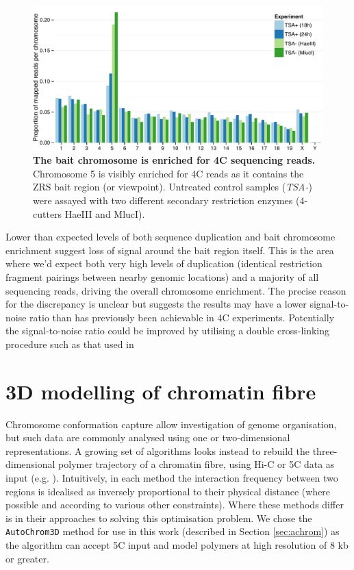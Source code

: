\documentclass[a4paper,11pt,oneside]{book}
\begin{document}
\begin{figure}
\begin{center} 
\includegraphics[width=5.4in]{figs/4c_chromosomes.pdf}
\captionsetup{width=\textwidth} 
\caption[ The bait chromosome is enriched for 4C sequencing reads. ]{ {\bf The bait chromosome is enriched for 4C sequencing reads. }
Chromosome 5 is visibly enriched for 4C reads as it  contains the ZRS bait region (or viewpoint). Untreated control samples (\emph{TSA-}) were assayed with two different secondary restriction enzymes (4-cutters HaeIII and MlucI).
}\label{fig:4cchromosomes}
\end{center} 
\end{figure} 

Lower than expected levels of both sequence duplication and bait chromosome enrichment suggest loss of signal around the bait region itself. This is the area where we'd expect both very high levels of duplication (identical restriction fragment pairings between nearby genomic locations) and a majority of all sequencing reads, driving the overall chromosome enrichment. The precise reason for the discrepancy is unclear but suggests the results may have a lower signal-to-noise ratio than has previously been achievable in 4C experiments.\cite{Stadhouders2013} Potentially the signal-to-noise ratio could be improved by utilising a double cross-linking procedure such as that used in \citet{Lin2012}

\section{3D modelling of chromatin fibre}

Chromosome conformation capture allow investigation of genome organisation, but such data are commonly analysed using one or two-dimensional representations. A growing set of algorithms looks instead to rebuild the three-dimensional polymer trajectory of a chromatin fibre, using Hi-C or 5C data as input (e.g. ). Intuitively, in each method the interaction frequency between two regions is idealised as inversely proportional to their physical distance (where possible and according to various other constraints). Where these methods differ is in their approaches to solving this optimisation problem. We chose the \texttt{AutoChrom3D} method\cite{Peng2013} for use in this work (described in Section \ref{sec:achrom}) as the algorithm can accept 5C input and model polymers at high resolution of 8 kb or greater.
\end{document}
